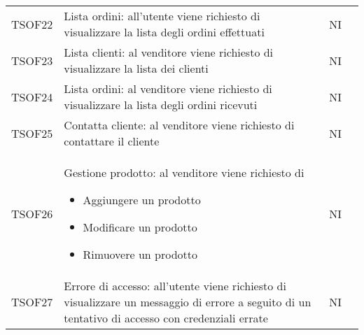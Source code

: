 \begin{center}
\begin{longtable}[!h]{p{50px} p{245px} p{75px} p{50px}}
        TSOF22                           & Lista ordini: all'utente viene richiesto di visualizzare la lista degli ordini effettuati                                                        & NI             \\
        TSOF23                           & Lista clienti: al venditore viene richiesto di visualizzare la lista dei clienti                                                                 & NI             \\
        TSOF24                           & Lista ordini: al venditore viene richiesto di visualizzare la lista degli ordini ricevuti                                                        & NI             \\
        TSOF25                           & Contatta cliente: al venditore viene richiesto di contattare il cliente                                                                          & NI             \\
        TSOF26                           & Gestione prodotto: al venditore viene richiesto di \begin{itemize} \item Aggiungere un prodotto \item Modificare un prodotto \item Rimuovere un prodotto \end{itemize}                                                                    & NI             \\
        TSOF27                           & Errore di accesso: all'utente viene richiesto di visualizzare un messaggio di errore a seguito di un tentativo di accesso con credenziali errate & NI             \\
    \end{longtable}
\end{center}